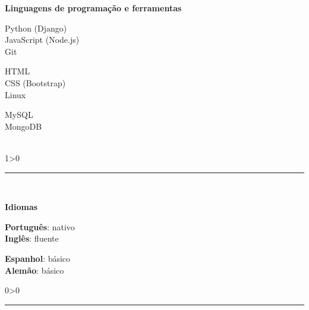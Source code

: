 \documentclass[a4paper,10pt]{article}
\newcommand{\criaSecao}[4][0]{
    \noindent
	\begin{minipage}{0.16\linewidth}
		\large{\textbf{#2}}
		\vspace{#3\baselineskip}
	\end{minipage}
	\hfill
	\begin{minipage}{0.79\linewidth}
		#4
		\ifnum0#1>0 { \hrule {\ } } \fi
	\end{minipage}
	\vspace{\baselineskip}
}
\begin{document}
    \criaSecao[1]{Linguagens de programação e ferramentas}{1}{
        \large{\bf
			\begin{minipage}{0.33\linewidth}
				Python (Django)\\
				JavaScript (Node.js)\\
				Git\\
			\end{minipage}
			\begin{minipage}{0.33\linewidth}
				HTML\\
				CSS (Bootstrap)\\
				Linux\\
			\end{minipage}
			\begin{minipage}{0.33\linewidth}
				MySQL\\
				MongoDB\\
				\\
			\end{minipage}
		}
    }
	
	\criaSecao{Idiomas}{1}{
	    \large{
			\begin{minipage}{0.5\linewidth}
				\textbf{Português}: nativo \\
				\textbf{Inglês}: fluente \\
			\end{minipage}
			\begin{minipage}{0.5\linewidth}
				\textbf{Espanhol}: básico \\
				\textbf{Alemão}: básico \\
			\end{minipage}
		}
	}
\label{ultimaPagina}
\end{document}
